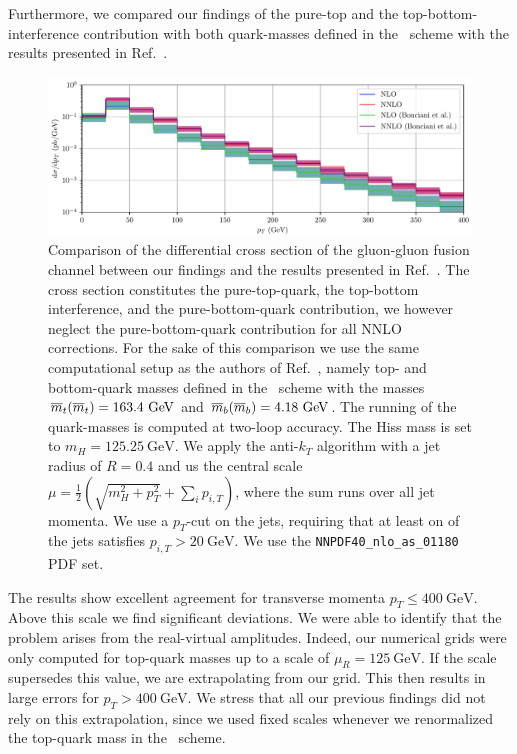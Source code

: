 Furthermore, we compared our findings of the pure-top and the top-bottom-interference contribution with both quark-masses defined in the \MS\ scheme with the results presented in Ref.~\cite{Bonciani:2022jmb}.
\begin{figure}[h]
\centering
\includegraphics[width=\textwidth]{Images/pTBonciani.pdf}
\caption{Comparison of the differential cross section of the gluon-gluon fusion channel between our findings and the results presented in Ref.~\cite{Bonciani:2022jmb}. The cross section constitutes the pure-top-quark, the top-bottom interference, and the pure-bottom-quark contribution, we however neglect the pure-bottom-quark contribution for all \acs{NNLO} corrections. For the sake of this comparison we use the same computational setup as the authors of Ref.~\cite{Bonciani:2022jmb}, namely top- and bottom-quark masses defined in the \MS\ scheme with the masses $\msMass{t} = 163.4\ \mathrm{GeV}$ and $\msMass{b} = 4.18\ \mathrm{GeV}$. The running of the quark-masses is computed at two-loop accuracy. The Hiss mass is set to $m_H = 125.25\ \mathrm{GeV}$. We apply the anti-$k_T$ algorithm with a jet radius of $R = 0.4$ and us the central scale $\mu = \frac{1}{2}\left( \sqrt{m_H^2 + p_T^2} + \sum_i p_{i, T} \right)$, where the sum runs over all jet momenta. We use a $p_T$-cut on the jets, requiring that at least on of the jets satisfies $p_{i,T} > 20 \ \mathrm{GeV}$. We use the \texttt{NNPDF40\_nlo\_as\_01180} \acs{PDF} set.}
\label{fig:6:bonciani_comparison}
\end{figure}
The results show excellent agreement for transverse momenta $p_T \le 400 \ \mathrm{GeV}$. Above this scale we find significant deviations. We were able to identify that the problem arises from the real-virtual amplitudes. Indeed, our numerical grids were only computed for top-quark masses up to a scale of $\mu_R = 125\ \mathrm{GeV}$. If the scale supersedes this value, we are extrapolating from our grid. This then results in large errors for $p_T > 400 \ \mathrm{GeV}$. We stress that all our previous findings did not rely on this extrapolation, since we used fixed scales whenever we renormalized the top-quark mass in the \MS\ scheme.

